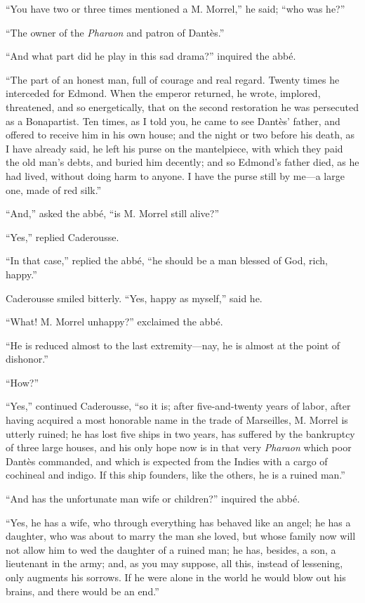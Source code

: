 “You have two or three times mentioned a M. Morrel,” he said; “who was
he?”

“The owner of the \textit{Pharaon} and patron of Dantès.”

“And what part did he play in this sad drama?” inquired the abbé.

“The part of an honest man, full of courage and real regard. Twenty
times he interceded for Edmond. When the emperor returned, he wrote,
implored, threatened, and so energetically, that on the second
restoration he was persecuted as a Bonapartist. Ten times, as I told
you, he came to see Dantès’ father, and offered to receive him in his
own house; and the night or two before his death, as I have already
said, he left his purse on the mantelpiece, with which they paid the
old man’s debts, and buried him decently; and so Edmond’s father died,
as he had lived, without doing harm to anyone. I have the purse still
by me—a large one, made of red silk.”

“And,” asked the abbé, “is M. Morrel still alive?”

“Yes,” replied Caderousse.

“In that case,” replied the abbé, “he should be a man blessed of God,
rich, happy.”

Caderousse smiled bitterly. “Yes, happy as myself,” said he.

“What! M. Morrel unhappy?” exclaimed the abbé.

“He is reduced almost to the last extremity—nay, he is almost at the
point of dishonor.”

“How?”

“Yes,” continued Caderousse, “so it is; after five-and-twenty years of
labor, after having acquired a most honorable name in the trade of
Marseilles, M. Morrel is utterly ruined; he has lost five ships in two
years, has suffered by the bankruptcy of three large houses, and his
only hope now is in that very \textit{Pharaon} which poor Dantès commanded,
and which is expected from the Indies with a cargo of cochineal and
indigo. If this ship founders, like the others, he is a ruined man.”

“And has the unfortunate man wife or children?” inquired the abbé.

“Yes, he has a wife, who through everything has behaved like an angel;
he has a daughter, who was about to marry the man she loved, but whose
family now will not allow him to wed the daughter of a ruined man; he
has, besides, a son, a lieutenant in the army; and, as you may suppose,
all this, instead of lessening, only augments his sorrows. If he were
alone in the world he would blow out his brains, and there would be an
end.”

